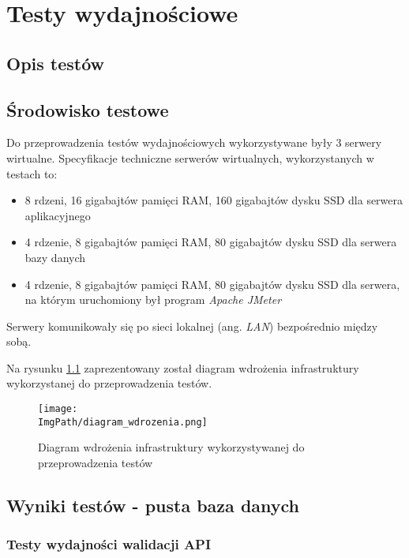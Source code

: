 \chapter{Testy wydajnościowe}
\section{Opis testów}

\section{Środowisko testowe}
Do przeprowadzenia testów wydajnościowych wykorzystywane były 3 serwery wirtualne. Specyfikacje techniczne serwerów wirtualnych, wykorzystanych w testach to: 
\begin{itemize}
    \item 8 rdzeni, 16 gigabajtów pamięci RAM, 160 gigabajtów dysku SSD dla serwera aplikacyjnego
    \item 4 rdzenie, 8 gigabajtów pamięci RAM, 80 gigabajtów dysku SSD dla serwera bazy danych 
    \item 4 rdzenie, 8 gigabajtów pamięci RAM, 80 gigabajtów dysku SSD dla serwera, na którym uruchomiony był program \textsl{Apache JMeter}
\end{itemize}
Serwery komunikowały się po sieci lokalnej (ang. \textsl{LAN}) bezpośrednio między sobą.

Na rysunku \ref{fig:deployment_diagram} zaprezentowany został diagram wdrożenia infrastruktury wykorzystanej do przeprowadzenia testów.
\begin{figure}[!ht]
\centering
\texttt{[image: \\ImgPath/diagram\_wdrozenia.png]}
\caption{Diagram wdrożenia infrastruktury wykorzystywanej do przeprowadzenia testów}
\label{fig:deployment_diagram}
\end{figure}

\section{Wyniki testów - pusta baza danych}

\newpage
\subsection{Testy wydajności walidacji API}


\clearpage

